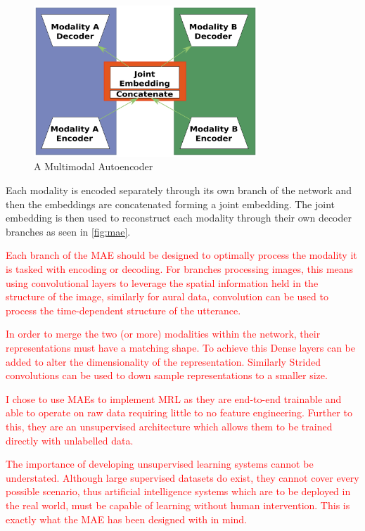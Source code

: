 \begin{figure}
	\centering
	\includegraphics[width=0.75\textwidth]{Figs/intro2dl/MAE.png}
	
	\caption{A Multimodal Autoencoder}
	\label{fig:mae}
\end{figure}

Each modality is encoded separately through its own branch of the network and then the embeddings are concatenated forming a joint embedding. The joint embedding is then used to reconstruct each modality through their own decoder branches as seen in \autoref{fig:mae}.

\textcolor{red}{Each branch of the \ac{MAE} should be designed to optimally process the modality it is tasked with encoding or decoding. For branches processing images, this means using convolutional layers to leverage the spatial information held in the structure of the image, similarly for aural data, convolution can be used to process the time-dependent structure of the utterance.} 

\textcolor{red}{In order to merge the two (or more) modalities within the network, their representations must have a matching shape. To achieve this Dense layers can be added to alter the dimensionality of the representation. Similarly Strided convolutions can be used to down sample representations to a smaller size.}

\textcolor{red}{I chose to use \acp{MAE} to implement \ac{MRL} as they are end-to-end trainable and able to operate on raw data requiring little to no feature engineering. Further to this, they are an unsupervised architecture which allows them to be trained directly with unlabelled data.}

\textcolor{red}{The importance of developing unsupervised learning systems cannot be understated. Although large supervised datasets do exist, they cannot cover every possible scenario, thus artificial intelligence systems which are to be deployed in the real world, must be capable of learning without human intervention. This is exactly what the \ac{MAE} has been designed with in mind.}

